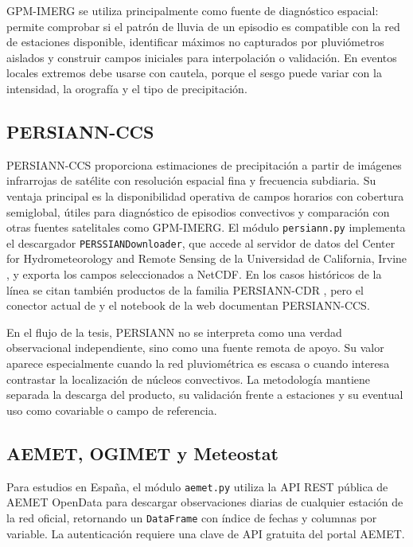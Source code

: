GPM-IMERG se utiliza principalmente como fuente de diagnóstico espacial: permite comprobar si el patrón de lluvia de un episodio es compatible con la red de estaciones disponible, identificar máximos no capturados por pluviómetros aislados y construir campos iniciales para interpolación o validación. En eventos locales extremos debe usarse con cautela, porque el sesgo puede variar con la intensidad, la orografía y el tipo de precipitación.

\subsection{PERSIANN-CCS}

PERSIANN-CCS \parencite{hong2004persiannccs} proporciona estimaciones de precipitación a partir de imágenes infrarrojas de satélite con resolución espacial fina y frecuencia subdiaria. Su ventaja principal es la disponibilidad operativa de campos horarios con cobertura semiglobal, útiles para diagnóstico de episodios convectivos y comparación con otras fuentes satelitales como GPM-IMERG. El módulo \texttt{persiann.py} implementa el descargador \texttt{PERSSIANDownloader}, que accede al servidor de datos del Center for Hydrometeorology and Remote Sensing de la Universidad de California, Irvine \parencite{chrsdata}, y exporta los campos seleccionados a NetCDF. En los casos históricos de la línea se citan también productos de la familia PERSIANN-CDR \parencite{ashouri2015persiann}, pero el conector actual de \pyhydra y el notebook de la web documentan PERSIANN-CCS.

En el flujo de la tesis, PERSIANN no se interpreta como una verdad observacional independiente, sino como una fuente remota de apoyo. Su valor aparece especialmente cuando la red pluviométrica es escasa o cuando interesa contrastar la localización de núcleos convectivos. La metodología mantiene separada la descarga del producto, su validación frente a estaciones y su eventual uso como covariable o campo de referencia.

\subsection{AEMET, OGIMET y Meteostat}

Para estudios en España, el módulo \texttt{aemet.py} utiliza la API REST pública de AEMET OpenData \parencite{aemetopendata} para descargar observaciones diarias de cualquier estación de la red oficial, retornando un \texttt{DataFrame} con índice de fechas y columnas por variable. La autenticación requiere una clave de API gratuita del portal AEMET.

